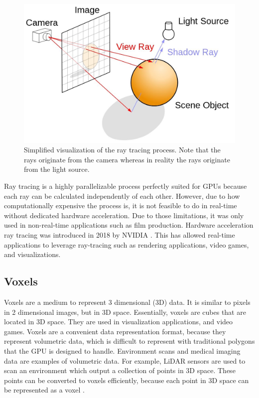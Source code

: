 \documentclass[12pt]{article}
\begin{document}
\begin{figure}[H]
    \begin{center}
        \includegraphics[scale=0.22]{RayTracingImage}
    \end{center}
    \caption{Simplified visualization of the ray tracing process. Note that the rays originate from the camera whereas in reality the rays originate from the light source.}
    \label{fig:RayTracingImage}
\end{figure}

Ray tracing is a highly parallelizable process perfectly suited for GPUs because each ray can be calculated independently of each other.
However, due to how computationally expensive the
process is, it is not feasible to do in real-time without dedicated hardware
acceleration. Due to those limitations, it was only used in non-real-time
applications such as film production. Hardware acceleration ray tracing was introduced in 2018 by NVIDIA \parencite{NVIDIA:DXR-Intro}.
This has allowed real-time applications to leverage ray-tracing such as rendering applications, video games, and visualizations.

\subsection{Voxels}

Voxels are a medium to represent 3 dimensional (3D) data. It is similar to pixels in 2 dimensional images,
but in 3D space. Essentially, voxels are cubes that are located in 3D space.
They are used in visualization applications, and video games.
Voxels are a convenient data representation format, because they represent
volumetric data, which is difficult to represent with traditional polygons that the GPU is designed to handle.
Environment scans and medical imaging data are examples of volumetric data.
For example, LiDAR sensors are used to scan an environment which output a collection of points in 3D space.
These points can be converted to voxels efficiently, because each point in 3D space can be represented as a voxel \parencite{NOS:LiDAR}.
\end{document}
